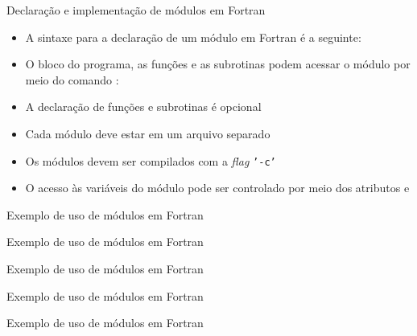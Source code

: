 \begin{frame}[fragile]{Declaração e implementação de módulos em Fortran}

    \begin{itemize}
        \item A sintaxe para a declaração de um módulo em Fortran é a seguinte:

 
        \item O bloco do programa, as funções e as subrotinas podem acessar o módulo por meio
            do comando :


        \item A declaração de funções e subrotinas é opcional

        \item Cada módulo deve estar em um arquivo separado 

        \item Os módulos devem ser compilados com a \textit{flag} \texttt{'-c'}

        \item O acesso às variáveis do módulo pode ser controlado por meio dos atributos
             e 

    \end{itemize}

\end{frame}

\begin{frame}[fragile]{Exemplo de uso de módulos em Fortran}
\end{frame}

\begin{frame}[fragile]{Exemplo de uso de módulos em Fortran}
\end{frame}

\begin{frame}[fragile]{Exemplo de uso de módulos em Fortran}
\end{frame}

\begin{frame}[fragile]{Exemplo de uso de módulos em Fortran}
\end{frame}

\begin{frame}[fragile]{Exemplo de uso de módulos em Fortran}
\end{frame}
